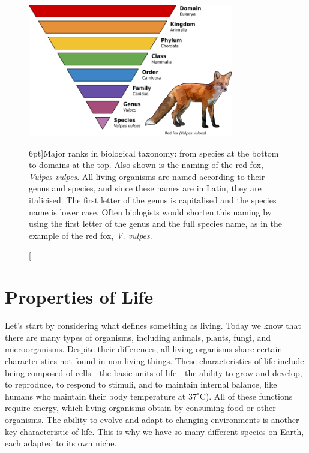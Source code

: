 \begin{figure}
  \includegraphics[width=0.8\textwidth]{figs/molbiol/taxonomy.png}
  \caption[][6pt]{Major ranks in biological taxonomy: from species at the bottom to domains at the top. Also shown is the naming of the red fox, \textit{Vulpes vulpes}. All living organisms are named according to their genus and species, and since these names are in Latin, they are italicised. The first letter of the genus is capitalised and the species name is lower case. Often biologists would shorten this naming by using the first letter of the genus and the full species name, as in the example of the red fox, \textit{V. vulpes}.}
  \label{fig:taxonomy}
\end{figure}


\section{Properties of Life}

Let's start by considering what defines something as living. Today we know that there are many types of organisms, including animals, plants, fungi, and microorganisms. Despite their differences, all living organisms share certain characteristics not found in non-living things. These characteristics of life include being composed of cells - the basic units of life - the ability to grow and develop, to reproduce, to respond to stimuli, and to maintain internal balance, like humans who maintain their body temperature at \(37^\circ\mathrm{C}\)). All of these functions require energy, which living organisms obtain by consuming food or other organisms. The ability to evolve and adapt to changing environments is another key characteristic of life. This is why we have so many different species on Earth, each adapted to its own niche.

